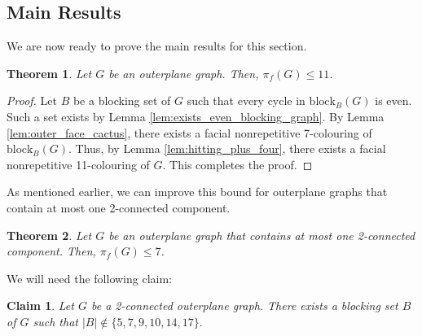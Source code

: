 \documentclass{patmorin}
\newcommand{\block}{\mathrm{block}}
\newtheorem{theorem}{Theorem}[section]
\newtheorem{claim}{Claim}[theorem]
\newcommand{\thmfacialoutplanar}{Let $G$ be an outerplane graph. Then, $\pi_f(G) \leq 11$.}
\newcommand{\thmfacialoutplanarbic}{Let $G$ be an outerplane graph that contains at most one 2-connected component. Then, $\pi_f(G) \leq 7$.}
\begin{document}
\subsection{Main Results}

We are now ready to prove the main results for this section.

\begin{theorem}
 \thmfacialoutplanar
\label{thm:facial_outplanar}
\end{theorem}

\begin{proof}
Let $B$ be a blocking set of $G$ such that every cycle in $\block_{B}(G)$ is even. Such a set exists by Lemma \ref{lem:exists_even_blocking_graph}. By Lemma \ref{lem:outer_face_cactus}, there exists a facial nonrepetitive 7-colouring of $\block_{B}(G)$. Thus, by Lemma \ref{lem:hitting_plus_four}, there exists a facial nonrepetitive 11-colouring of $G$. This completes the proof. 
\end{proof}

As mentioned earlier, we can improve this bound for outerplane graphs that contain at most one 2-connected component.

\begin{theorem}
 \thmfacialoutplanarbic
\label{thm:facial_outplanar_bic}
\end{theorem}
We will need the following claim:

\begin{claim}
 Let $G$ be a 2-connected outerplane graph. There exists a blocking set $B$ of $G$ such that 
 $|B| \notin \{5, 7, 9, 10, 14, 17\}.$
 \label{claim:existsNoBadBlocking}
\end{claim}
\end{document}
